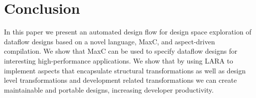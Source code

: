 \section{Conclusion}

In this paper we present an automated design flow for design space
exploration of dataflow designs based on a novel language, MaxC, and
aspect-driven compilation. We show that MaxC can be used to specify
dataflow designs for interesting high-performance applications. We
show that by using LARA to implement aspects that encapsulate
structural transformations as well as design level transformations and
development related transformations we can create maintainable and
portable designs, increasing developer productivity.

